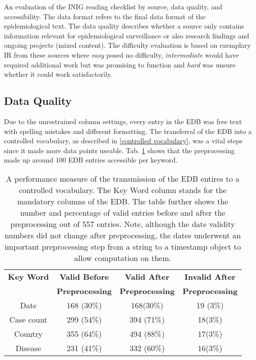 \begin{table}
    \caption{An evaluation of the INIG reading checklist by source, data quality, and accessibility. The data format refers to the final data format of the epidemiological text. The data quality describes whether a source only contains information relevant for epidemiological surveillance or also research findings and ongoing projects (mixed content). The difficulty evaluation is based on exemplary IR from these sources where \textsl{easy} posed no difficulty, \textsl{intermediate} would have required additional work but was promising to function and \textsl{hard} was unsure whether it could work satisfactorily.}
  \label{table:INIGsources}
  \end{table}

\subsection{Data Quality}
  Due to the unrestrained column settings, every entry in the EDB was free text with spelling mistakes and different formatting.
  The transferral of the EDB into a controlled vocabulary, as described in \ref{controlled vocabulary}, was a vital steps since it made more data points useable.
  Tab. \ref{table:preprocessing performance} shows that the preprocessing made up around 100 EDB entries accessible per keyword.

  \begin{table}
    \centering
    \caption{A performance measure of the transmission of the EDB entires to a controlled vocabulary. The Key Word column stands for the mandatory columns of the EDB. The table further shows the number and percentage of valid entries before and after the preprocessing out of 557 entries. Note, although the date validity numbers did not change after preprocessing, the dates underwent an important preprocessing step from a string to a timestamp object to allow computation on them.}
    \begin{tabular}{@{}cccc@{}}
      \toprule
      \textbf{Key Word} & \textbf{Valid Before} & \textbf{Valid After} & \textbf{Invalid After} \\
      & \textbf{Preprocessing} & \textbf{Preprocessing} & \textbf{Preprocessing} \\
      \midrule
      Date& 168 (30\%)& 168(30\%)&  19 (3\%) \\
      Case count& 299 (54\%)& 394 (71\%)&  18(3\%) \\
      Country& 355 (64\%)& 494 (88\%)&  17(3\%) \\
      Disease& 231 (41\%)& 332 (60\%)& 16(3\%) \\
      \bottomrule
    \end{tabular}
  \label{table:preprocessing performance}
  \end{table}

